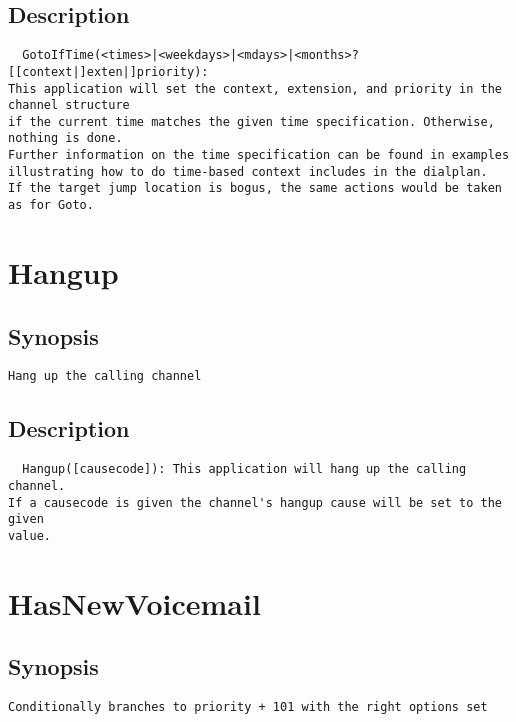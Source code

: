 \subsection{Description}
\begin{verbatim}
  GotoIfTime(<times>|<weekdays>|<mdays>|<months>?[[context|]exten|]priority):
This application will set the context, extension, and priority in the channel structure
if the current time matches the given time specification. Otherwise, nothing is done.
Further information on the time specification can be found in examples
illustrating how to do time-based context includes in the dialplan.
If the target jump location is bogus, the same actions would be taken as for Goto.

\end{verbatim}


\section{Hangup}
\subsection{Synopsis}
\begin{verbatim}
Hang up the calling channel
\end{verbatim}
\subsection{Description}
\begin{verbatim}
  Hangup([causecode]): This application will hang up the calling channel.
If a causecode is given the channel's hangup cause will be set to the given
value.

\end{verbatim}


\section{HasNewVoicemail}
\subsection{Synopsis}
\begin{verbatim}
Conditionally branches to priority + 101 with the right options set
\end{verbatim}

